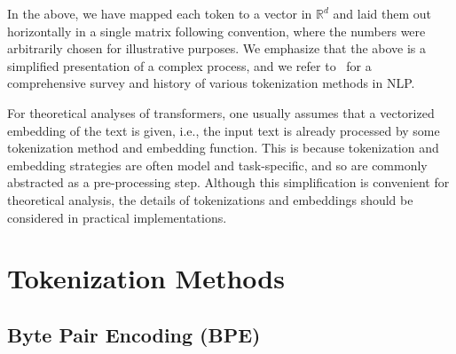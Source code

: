 In the above, we have mapped each token to a vector in \(\mathbb{R}^{d}\) and laid them out horizontally in a single matrix following convention, where the numbers were arbitrarily chosen for illustrative purposes.
We emphasize that the above is a simplified presentation of a complex process, and we refer to~\citep{mielke2021between} for a comprehensive survey and history of various tokenization methods in NLP.



For theoretical analyses of transformers, one usually assumes that a vectorized embedding of the text is given, i.e., the input text is already processed by some tokenization method and embedding function.
This is because tokenization and embedding strategies are often model and task-specific, and so are commonly abstracted as a pre-processing step.
Although this simplification is convenient for theoretical analysis, the details of tokenizations and embeddings should be considered in practical implementations.





\section{Tokenization Methods}

\subsection{Byte Pair Encoding (BPE)}

